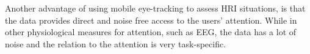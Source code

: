 \documentclass{sig-alternate}
\begin{document}
Another advantage of using mobile eye-tracking to assess HRI situations, is that
the data provides direct and noise free access to the users' attention. While in
other physiological measures for attention, such as EEG, the data has a lot of
noise and the relation to the attention is very task-specific.


%
%
%
%

\end{document}
